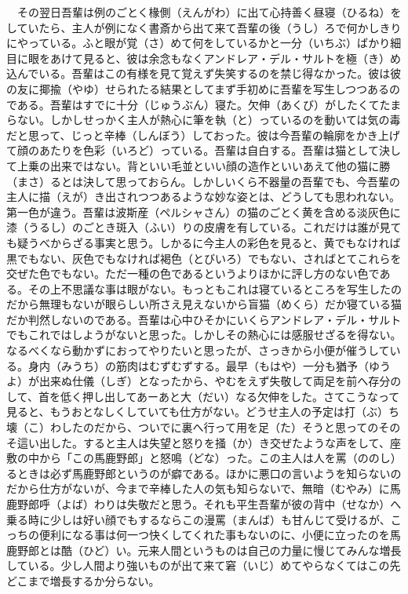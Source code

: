 \documentclass{book}
\begin{document}
　その翌日吾輩は例のごとく椽側（えんがわ）に出て心持善く昼寝（ひるね）をしていたら、主人が例になく書斎から出て来て吾輩の後（うし）ろで何かしきりにやっている。ふと眼が覚（さ）めて何をしているかと一分（いちぶ）ばかり細目に眼をあけて見ると、彼は余念もなくアンドレア・デル・サルトを極（き）め込んでいる。吾輩はこの有様を見て覚えず失笑するのを禁じ得なかった。彼は彼の友に揶揄（やゆ）せられたる結果としてまず手初めに吾輩を写生しつつあるのである。吾輩はすでに十分（じゅうぶん）寝た。欠伸（あくび）がしたくてたまらない。しかしせっかく主人が熱心に筆を執（と）っているのを動いては気の毒だと思って、じっと辛棒（しんぼう）しておった。彼は今吾輩の輪廓をかき上げて顔のあたりを色彩（いろど）っている。吾輩は自白する。吾輩は猫として決して上乗の出来ではない。背といい毛並といい顔の造作といいあえて他の猫に勝（まさ）るとは決して思っておらん。しかしいくら不器量の吾輩でも、今吾輩の主人に描（えが）き出されつつあるような妙な姿とは、どうしても思われない。第一色が違う。吾輩は波斯産（ペルシャさん）の猫のごとく黄を含める淡灰色に漆（うるし）のごとき斑入（ふい）りの皮膚を有している。これだけは誰が見ても疑うべからざる事実と思う。しかるに今主人の彩色を見ると、黄でもなければ黒でもない、灰色でもなければ褐色（とびいろ）でもない、さればとてこれらを交ぜた色でもない。ただ一種の色であるというよりほかに評し方のない色である。その上不思議な事は眼がない。もっともこれは寝ているところを写生したのだから無理もないが眼らしい所さえ見えないから盲猫（めくら）だか寝ている猫だか判然しないのである。吾輩は心中ひそかにいくらアンドレア・デル・サルトでもこれではしようがないと思った。しかしその熱心には感服せざるを得ない。なるべくなら動かずにおってやりたいと思ったが、さっきから小便が催うしている。身内（みうち）の筋肉はむずむずする。最早（もはや）一分も猶予（ゆうよ）が出来ぬ仕儀（しぎ）となったから、やむをえず失敬して両足を前へ存分のして、首を低く押し出してあーあと大（だい）なる欠伸をした。さてこうなって見ると、もうおとなしくしていても仕方がない。どうせ主人の予定は打（ぶ）ち壊（こ）わしたのだから、ついでに裏へ行って用を足（た）そうと思ってのそのそ這い出した。すると主人は失望と怒りを掻（か）き交ぜたような声をして、座敷の中から「この馬鹿野郎」と怒鳴（どな）った。この主人は人を罵（ののし）るときは必ず馬鹿野郎というのが癖である。ほかに悪口の言いようを知らないのだから仕方がないが、今まで辛棒した人の気も知らないで、無暗（むやみ）に馬鹿野郎呼（よば）わりは失敬だと思う。それも平生吾輩が彼の背中（せなか）へ乗る時に少しは好い顔でもするならこの漫罵（まんば）も甘んじて受けるが、こっちの便利になる事は何一つ快くしてくれた事もないのに、小便に立ったのを馬鹿野郎とは酷（ひど）い。元来人間というものは自己の力量に慢じてみんな増長している。少し人間より強いものが出て来て窘（いじ）めてやらなくてはこの先どこまで増長するか分らない。\\
\end{document}
